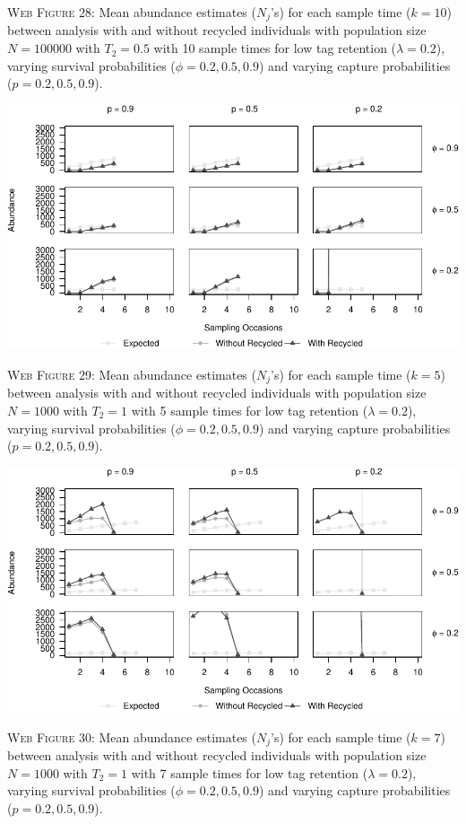 \documentclass[]{article}
\begin{document}
\textsc{Web Figure 28:} Mean abundance estimates (\(N_j\)'s) for each
sample time (\(k=10\)) between analysis with and without recycled
individuals with population size \(N=100000\) with \(T_2=0.5\) with 10
sample times for low tag retention (\(\lambda=0.2\)), varying survival
probabilities (\(\phi=0.2,0.5,0.9\)) and varying capture probabilities
(\(p=0.2,0.5,0.9\)).

\newpage

\includegraphics{Appendix_BW_files/figure-latex/29_abundance_L_GJSTL5-1.pdf}

\textsc{Web Figure 29:} Mean abundance estimates (\(N_j\)'s) for each
sample time (\(k=5\)) between analysis with and without recycled
individuals with population size \(N=1000\) with \(T_2=1\) with 5 sample times for low tag retention (\(\lambda=0.2\)), varying survival
probabilities (\(\phi=0.2,0.5,0.9\)) and varying capture probabilities
(\(p=0.2,0.5,0.9\)).

\includegraphics{Appendix_BW_files/figure-latex/30_abundance_L_GJSTL6-1.pdf}

\textsc{Web Figure 30:} Mean abundance estimates (\(N_j\)'s) for each
sample time (\(k=7\)) between analysis with and without recycled
individuals with population size \(N=1000\) with \(T_2=1\) with 7 sample times
for low tag retention (\(\lambda=0.2\)), varying survival
probabilities (\(\phi=0.2,0.5,0.9\)) and varying capture probabilities
(\(p=0.2,0.5,0.9\)).
\end{document}
